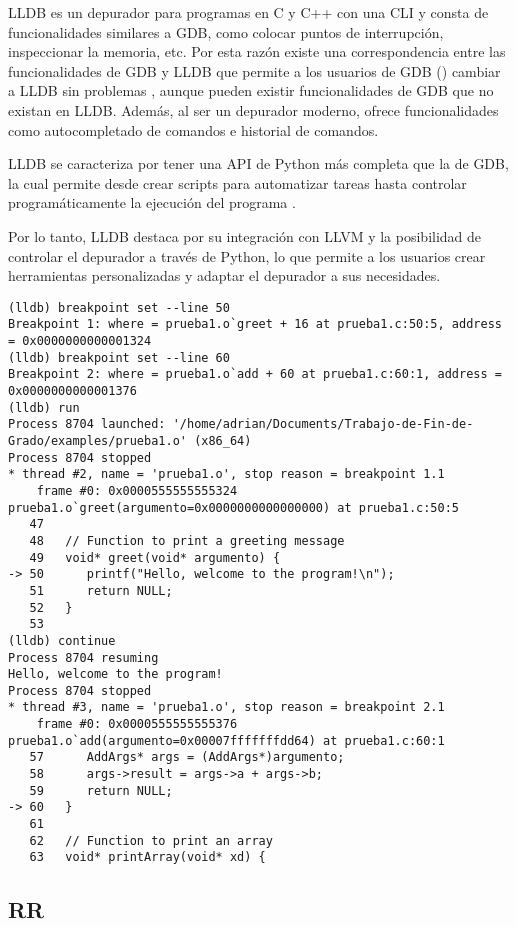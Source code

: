LLDB es un \gls{depurador} para programas en C y C++ con una \gls{CLI} y consta de funcionalidades similares a GDB, como colocar puntos de interrupción, inspeccionar la memoria, etc. Por esta razón existe una correspondencia entre las funcionalidades de GDB y LLDB que permite a los usuarios de GDB () cambiar a LLDB sin problemas \cite{LLDB}, aunque pueden existir funcionalidades de GDB que no existan en LLDB. Además, al ser un \gls{depurador} moderno, ofrece funcionalidades como autocompletado de comandos e historial de comandos.

LLDB se caracteriza por tener una \gls{API} de Python más completa que la de GDB, la cual permite desde crear \glspl{script} para automatizar tareas hasta controlar programáticamente la ejecución del programa \cite{LLDBPython}. 

Por lo tanto, LLDB destaca por su integración con LLVM y la posibilidad de controlar el depurador a través de Python, lo que permite a los usuarios crear herramientas personalizadas y adaptar el \gls{depurador} a sus necesidades.

\begin{lstlisting}[caption={Muestra del depurador LLDB}]
    (lldb) breakpoint set --line 50
Breakpoint 1: where = prueba1.o`greet + 16 at prueba1.c:50:5, address = 0x0000000000001324
(lldb) breakpoint set --line 60
Breakpoint 2: where = prueba1.o`add + 60 at prueba1.c:60:1, address = 0x0000000000001376
(lldb) run
Process 8704 launched: '/home/adrian/Documents/Trabajo-de-Fin-de-Grado/examples/prueba1.o' (x86_64)
Process 8704 stopped
* thread #2, name = 'prueba1.o', stop reason = breakpoint 1.1
    frame #0: 0x0000555555555324 prueba1.o`greet(argumento=0x0000000000000000) at prueba1.c:50:5
   47  	
   48  	// Function to print a greeting message
   49  	void* greet(void* argumento) {
-> 50  	   printf("Hello, welcome to the program!\n");
   51  	   return NULL;
   52  	}
   53  	
(lldb) continue
Process 8704 resuming
Hello, welcome to the program!
Process 8704 stopped
* thread #3, name = 'prueba1.o', stop reason = breakpoint 2.1
    frame #0: 0x0000555555555376 prueba1.o`add(argumento=0x00007fffffffdd64) at prueba1.c:60:1
   57  	   AddArgs* args = (AddArgs*)argumento;
   58  	   args->result = args->a + args->b;
   59  	   return NULL;
-> 60  	}
   61  	
   62  	// Function to print an array
   63  	void* printArray(void* xd) {

\end{lstlisting}

\subsection{RR}{\label{subsec:rr}}



